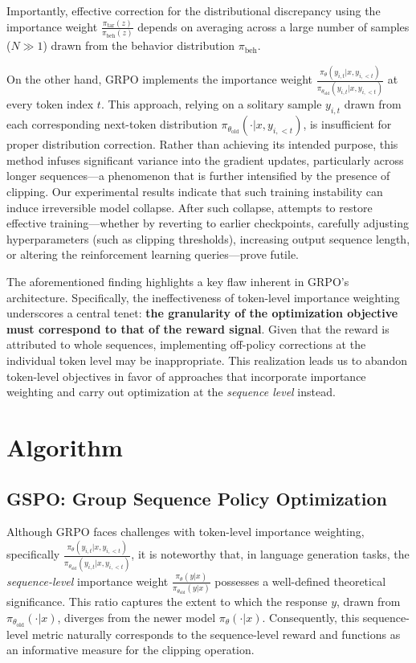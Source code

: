 Importantly, effective correction for the distributional discrepancy using the importance weight $\frac{ \pi_\text{tar} (z) }{ \pi_\text{beh} (z)}$ depends on averaging across a large number of samples ($N \gg 1$) drawn from the behavior distribution $\pi_\text{beh}$.

On the other hand, GRPO implements the importance weight $\frac{ \pi_{\theta} (y_{i,t} | x, y_{i,<t}) }{ \pi_{\theta_\text{old}} (y_{i,t} | x,y_{i,<t})}$ at every token index $t$. This approach, relying on a solitary sample $y_{i,t}$ drawn from each corresponding next-token distribution $\pi_{\theta_\text{old}}( \cdot | x, y_{i, <t})$, is insufficient for proper distribution correction. Rather than achieving its intended purpose, this method infuses significant variance into the gradient updates, particularly across longer sequences—a phenomenon that is further intensified by the presence of clipping. Our experimental results indicate that such training instability can induce irreversible model collapse. After such collapse, attempts to restore effective training—whether by reverting to earlier checkpoints, carefully adjusting hyperparameters (such as clipping thresholds), increasing output sequence length, or altering the reinforcement learning queries—prove futile.

The aforementioned finding highlights a key flaw inherent in GRPO’s architecture. Specifically, the ineffectiveness of token-level importance weighting underscores a central tenet: \textbf{the granularity of the optimization objective must correspond to that of the reward signal}. Given that the reward is attributed to whole sequences, implementing off-policy corrections at the individual token level may be inappropriate. This realization leads us to abandon token-level objectives in favor of approaches that incorporate importance weighting and carry out optimization at the \textit{sequence level} instead.

\section{Algorithm}

\subsection{GSPO: Group Sequence Policy Optimization}

Although GRPO faces challenges with token-level importance weighting, specifically $\frac{ \pi_{\theta} (y_{i,t} | x, y_{i,<t}) }{ \pi_{\theta_\text{old}} (y_{i,t} | x,y_{i,<t})}$, it is noteworthy that, in language generation tasks, the \textit{sequence-level} importance weight $\frac{ \pi_{\theta} (y | x) }{ \pi_{\theta_\text{old}} (y | x)}$ possesses a well-defined theoretical significance. This ratio captures the extent to which the response $y$, drawn from $\pi_{\theta_\text{old}} (\cdot | x)$, diverges from the newer model $\pi_{\theta} (\cdot | x)$. Consequently, this sequence-level metric naturally corresponds to the sequence-level reward and functions as an informative measure for the clipping operation.

